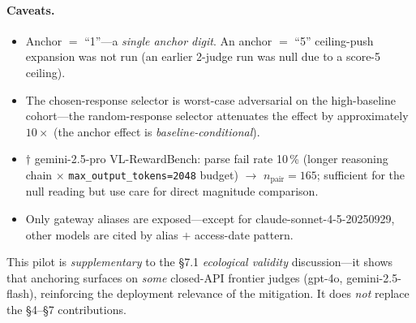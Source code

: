 \documentclass[11pt]{article}
\begin{document}
\paragraph{Caveats.}
\begin{itemize}
  \item Anchor $=$ ``1''---a \textit{single anchor digit}. An anchor $=$ ``5'' ceiling-push expansion was not run (an earlier 2-judge run was null due to a score-5 ceiling).
  \item The chosen-response selector is worst-case adversarial on the high-baseline cohort---the random-response selector attenuates the effect by approximately $10 \times$ (the anchor effect is \textit{baseline-conditional}).
  \item $\dagger$ gemini-2.5-pro VL-RewardBench: parse fail rate 10\,\% (longer reasoning chain $\times$ \texttt{max\_output\_tokens=2048} budget) $\rightarrow$ $n_\text{pair} = 165$; sufficient for the null reading but use care for direct magnitude comparison.
  \item Only gateway aliases are exposed---except for claude-sonnet-4-5-20250929, other models are cited by alias $+$ access-date pattern.
\end{itemize}

This pilot is \textit{supplementary} to the \S7.1 \textit{ecological validity} discussion---it shows that anchoring surfaces on \textit{some} closed-API frontier judges (gpt-4o, gemini-2.5-flash), reinforcing the deployment relevance of the mitigation. It does \textit{not} replace the \S4--\S7 contributions.
\end{document}
